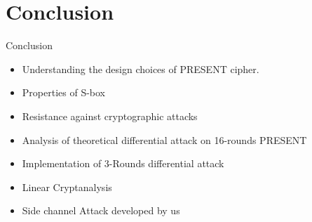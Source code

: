 \section{Conclusion}

\begin{frame}{Conclusion}
\begin{itemize}
    \item Understanding the design choices of PRESENT cipher. 
    \item Properties of S-box
    \item Resistance against cryptographic attacks
    \item Analysis of theoretical differential attack on 16-rounds PRESENT
    \item Implementation of 3-Rounds differential attack
    \item Linear Cryptanalysis
    \item Side channel Attack developed by us
\end{itemize}

\end{frame}
